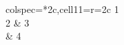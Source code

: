 \documentclass{standalone}
\begin{document}
\begin{tblr}{colspec={*{2}{c}},cell{1}{1}={r=2}{c}}
	{1   \\2} & 3 \\
	          & 4 \\
\end{tblr}
\end{document}
